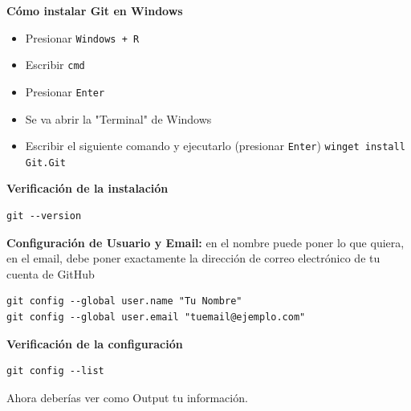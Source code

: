 \documentclass[a4paper]{article}
\begin{document}
\textbf{Cómo instalar Git en Windows}

\begin{itemize}
	\item Presionar \texttt{Windows + R}
	\item Escribir \texttt{cmd}
	\item Presionar \texttt{Enter}
	\item Se va abrir la "Terminal" de Windows
	\item Escribir el siguiente comando y ejecutarlo (presionar \texttt{Enter}) \texttt{winget install Git.Git}
\end{itemize}


\textbf{Verificación de la instalación}

\begin{verbatim}
git --version
\end{verbatim}

\textbf{Configuración de Usuario y Email:} en el nombre puede poner lo que quiera, en el email, debe poner exactamente la dirección de correo electrónico de tu cuenta de GitHub

\begin{verbatim}
git config --global user.name "Tu Nombre"
git config --global user.email "tuemail@ejemplo.com"
\end{verbatim}

\textbf{Verificación de la configuración}

\begin{verbatim}
git config --list
\end{verbatim}

Ahora deberías ver como Output tu información.
\end{document}
